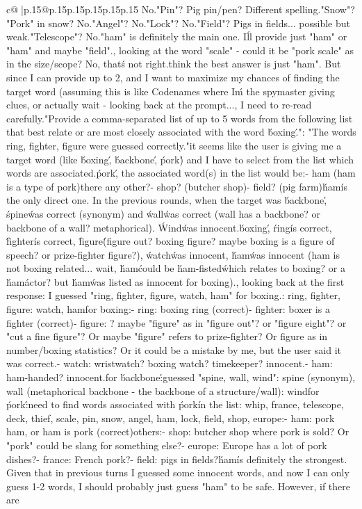 \documentclass{article}
\begin{document}
{\begin{supertabular}{c@{$\;$}|p{.15\linewidth}@{}p{.15\linewidth}p{.15\linewidth}p{.15\linewidth}p{.15\linewidth}p{.15\linewidth}}
{{{No.\n"Pin"? Pig pin/pen? Different spelling.\n"Snow"? "Pork" in snow? No.\n"Angel"? No.\n"Lock"? No.\n"Field"? Pigs in fields... possible but weak.\n"Telescope"? No.\n\nSo "ham" is definitely the main one. I\'ll provide just "ham" or "ham" and maybe "field".\n\nActually, looking at the word "scale" - could it be "pork scale" as in the size/scope? No, that\'s not right.\n\nI think the best answer is just "ham". But since I can provide up to 2, and I want to maximize my chances of finding the target word (assuming this is like Codenames where I\'m the spymaster giving clues, or actually wait - looking back at the prompt...\n\nWait, I need to re-read carefully.\n\n"Provide a comma-separated list of up to 5 words from the following list that best relate or are most closely associated with the word \'boxing\'."\n\nThen: "The words ring, fighter, figure were guessed correctly."\n\nSo it seems like the user is giving me a target word (like \'boxing\', \'backbone\', \'pork\') and I have to select from the list which words are associated.\n\nFor \'pork\', the associated word(s) in the list would be:\n- ham (ham is a type of pork)\n\nIs there any other?\n- shop? (butcher shop)\n- field? (pig farm)\n\nBut \'ham\' is the only direct one. In the previous rounds, when the target was \'backbone\', \'spine\' was correct (synonym) and \'wall\' was correct (wall has a backbone? or backbone of a wall? metaphorical). \'Wind\' was innocent.\n\nFor \'boxing\', \'ring\' is correct, \'fighter\' is correct, \'figure\' (figure out? boxing figure? maybe boxing is a figure of speech? or prize-fighter figure?), \'watch\' was innocent, \'ham\' was innocent (ham is not boxing related... wait, \'ham\' could be \'ham-fisted\' which relates to boxing? or a \'ham\' actor? but \'ham\' was listed as innocent for boxing).\n\nActually, looking back at the first response: I guessed "ring, fighter, figure, watch, ham" for boxing.\nCorrect: ring, fighter, figure\nInnocent: watch, ham\n\nSo for boxing:\n- ring: boxing ring (correct)\n- fighter: boxer is a fighter (correct)\n- figure: ? maybe "figure" as in "figure out"? or "figure eight"? or "cut a fine figure"? Or maybe "figure" refers to prize-fighter? Or figure as in number/boxing statistics? Or it could be a mistake by me, but the user said it was correct.\n- watch: wristwatch? boxing watch? timekeeper? innocent.\n- ham: ham-handed? innocent.\n\nNow for \'backbone\':\nI guessed "spine, wall, wind"\nCorrect: spine (synonym), wall (metaphorical backbone - the backbone of a structure/wall)\nInnocent: wind\n\nSo for \'pork\':\nI need to find words associated with \'pork\' in the list: whip, france, telescope, deck, thief, scale, pin, snow, angel, ham, lock, field, shop, europe\n\nClearly:\n- ham: pork ham, or ham is pork (correct)\n\nPotential others:\n- shop: butcher shop where pork is sold? Or "pork" could be slang for something else?\n- europe: Europe has a lot of pork dishes?\n- france: French pork?\n- field: pigs in fields?\n\nBut \'ham\' is definitely the strongest. Given that in previous turns I guessed some innocent words, and now I can only guess 1-2 words, I should probably just guess "ham" to be safe. However, if there are }}}
\end{supertabular}}
\end{document}
